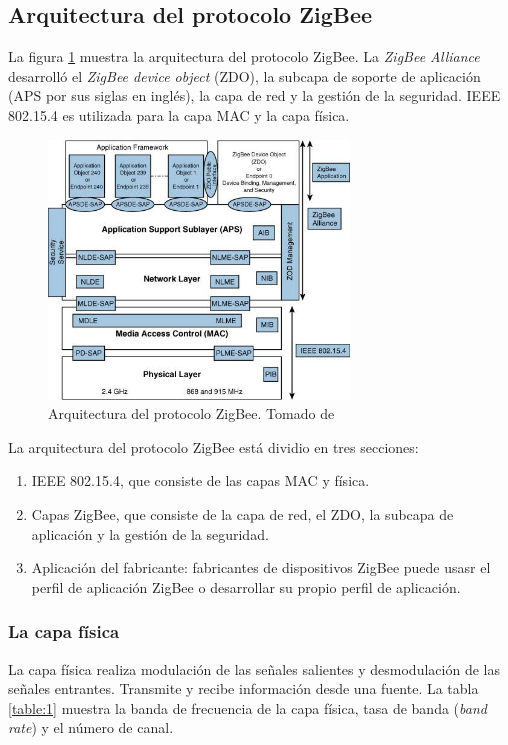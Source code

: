 \documentclass[10pt,journal,compsoc]{IEEEtran}
\begin{document}
\subsection{Arquitectura del protocolo ZigBee}
La figura \ref{fig:zigbee-architecture} muestra la arquitectura del protocolo ZigBee. La \emph{ZigBee Alliance} desarrolló el \emph{ZigBee device object} (ZDO), la subcapa de soporte de aplicación (APS por sus siglas en inglés), la capa de red y la gestión de la seguridad. IEEE 802.15.4 es utilizada para la capa MAC y la capa física. 

\begin{figure}[h]
    \centering
    \includegraphics[width=8cm]{zigbee-architecture}
    \caption{Arquitectura del protocolo ZigBee. Tomado de \cite{gshewender}}
    \label{fig:zigbee-architecture}
\end{figure}

La arquitectura del protocolo ZigBee está dividio en tres secciones:
\begin{enumerate}
    \item IEEE 802.15.4, que consiste de las capas MAC y física.
    \item Capas ZigBee, que consiste de la capa de red, el ZDO, la subcapa de aplicación y la gestión de la seguridad.
    \item Aplicación del fabricante: fabricantes de dispositivos ZigBee puede usasr el perfil de aplicación ZigBee o desarrollar su propio perfil de aplicación.
\end{enumerate}

\subsubsection{La capa física}
La capa física realiza modulación de las señales salientes y desmodulación de las señales entrantes. Transmite y recibe información desde una fuente. La tabla \ref{table:1} muestra la banda de frecuencia de la capa física, tasa de banda (\emph{band rate}) y el número de canal.
\end{document}
